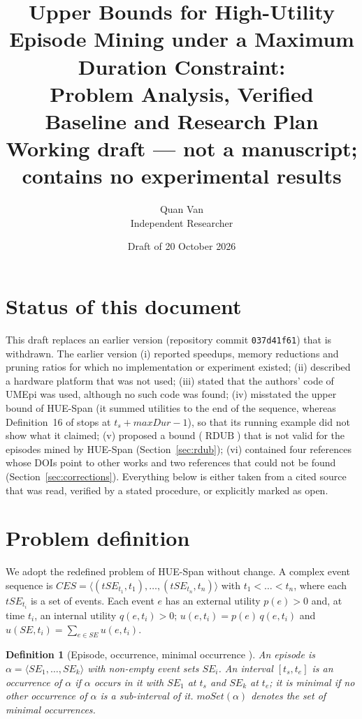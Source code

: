 \documentclass[11pt]{article}
\title{\textbf{Upper Bounds for High-Utility Episode Mining under a Maximum Duration Constraint:\\ Problem Analysis, Verified Baseline and Research Plan}\\[0.3em]
\large Working draft --- not a manuscript; contains no experimental results}
\author{Quan Van\\ Independent Researcher}
\date{Draft of 20 October 2026}
\newtheorem{definition}{Definition}
\newcommand{\RDUB}{\operatorname{RDUB}}
\newcommand{\HUESpan}{\textsf{HUE-Span}}
\newcommand{\UMEpi}{\textsf{UMEpi}}
\begin{document}
\maketitle

\section*{Status of this document}

This draft replaces an earlier version (repository commit \texttt{037d41f61}) that is withdrawn. The earlier version
(i) reported speedups, memory reductions and pruning ratios for which no implementation or experiment existed;
(ii) described a hardware platform that was not used;
(iii) stated that the authors' code of \UMEpi{} was used, although no such code was found;
(iv) misstated the upper bound of \HUESpan{} (it summed utilities to the end of the sequence, whereas Definition~16 of \cite{fournier2019huespan} stops at $t_s + \mathit{maxDur} - 1$), so that its running example did not show what it claimed;
(v) proposed a bound ($\RDUB$) that is not valid for the episodes mined by \HUESpan{} (Section~\ref{sec:rdub});
(vi) contained four references whose DOIs point to other works and two references that could not be found (Section~\ref{sec:corrections}).
Everything below is either taken from a cited source that was read, verified by a stated procedure, or explicitly marked as open.

\section{Problem definition}\label{sec:problem}

We adopt the redefined problem of \HUESpan{} \cite{fournier2019huespan} without change. A complex event sequence is
$\mathit{CES} = \langle (\mathit{tSE}_{t_1}, t_1), \dots, (\mathit{tSE}_{t_n}, t_n)\rangle$ with $t_1 < \dots < t_n$, where each
$\mathit{tSE}_{t_i}$ is a set of events. Each event $e$ has an external utility $p(e) > 0$ and, at time $t_i$, an internal utility
$q(e, t_i) > 0$; $u(e, t_i) = p(e)\, q(e, t_i)$ and $u(SE, t_i) = \sum_{e \in SE} u(e, t_i)$.

\begin{definition}[Episode, occurrence, minimal occurrence {\cite[Defs.~2--4]{fournier2019huespan}}]
An episode is $\alpha = \langle SE_1, \dots, SE_k\rangle$ with non-empty event sets $SE_i$. An interval $[t_s, t_e]$ is an occurrence of $\alpha$ if $\alpha$ occurs in it with $SE_1$ at $t_s$ and $SE_k$ at $t_e$; it is minimal if no other occurrence of $\alpha$ is a sub-interval of it. $\mathit{moSet}(\alpha)$ denotes the set of minimal occurrences.
\end{definition}
\end{document}
